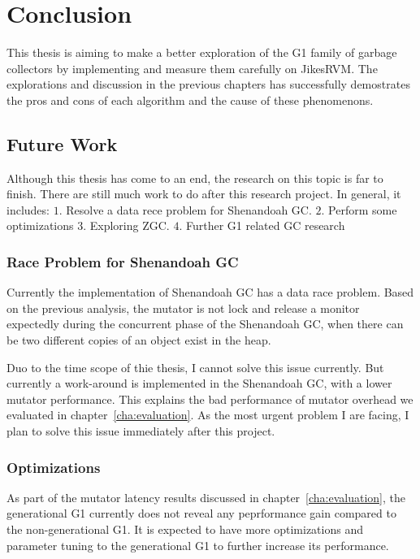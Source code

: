\chapter{Conclusion}
\label{cha:conc}

This thesis is aiming to make a better exploration of the G1 family of garbage collectors
by implementing and measure them carefully on JikesRVM.
The explorations and discussion in the previous chapters has successfully demostrates
the pros and cons of each algorithm and the cause of these phenomenons.

\section{Future Work}
\label{sec:future}

Although this thesis has come to an end, the research on this topic is far to finish.
There are still much work to do after this research project. In general, it includes:
$1.$ Resolve a data rece problem for Shenandoah GC.
$2.$ Perform some optimizations
$3.$ Exploring ZGC.
$4.$ Further G1 related GC research

\subsection{Race Problem for Shenandoah GC}

Currently the implementation of Shenandoah GC has a data race problem.
Based on the previous analysis, the mutator is not lock and release a monitor
expectedly during the concurrent phase of the Shenandoah GC, when there can be
two different copies of an object exist in the heap.

Duo to the time scope of thie thesis, I cannot solve this issue currently.
But currently a work-around is implemented in the Shenandoah GC, with a lower mutator performance.
This explains the bad performance of mutator overhead we evaluated in chapter~\ref{cha:evaluation}.
As the most urgent problem I are facing, I plan to solve this issue immediately after
this project.

\subsection{Optimizations}

As part of the mutator latency results discussed in chapter~\ref{cha:evaluation},
the generational G1 currently does not reveal any peprformance gain compared to
the non-generational G1. It is expected to have more optimizations and parameter
tuning to the generational G1 to further increase its performance.

